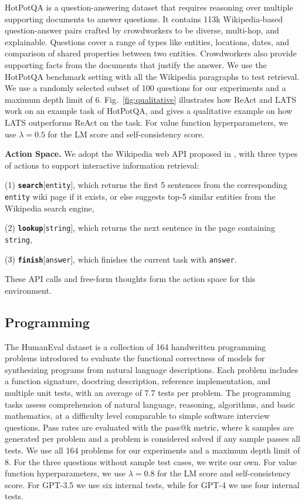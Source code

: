 {HotPotQA \citep{yang2018hotpotqa} is a question-answering dataset that requires reasoning over multiple supporting documents to answer questions. It contains 113k Wikipedia-based question-answer pairs crafted by crowdworkers to be diverse, multi-hop, and explainable. Questions cover a range of types like entities, locations, dates, and comparison of shared properties between two entities. Crowdworkers also provide supporting facts from the documents that justify the answer. We use the HotPotQA benchmark setting with all the Wikipedia paragraphs to test retrieval. We use a randomly selected subset of 100 questions for our experiments and a maximum depth limit of 6. {Fig.~\ref{fig:qualitative} illustrates how ReAct and LATS work on an example task of HotPotQA, and gives a qualitative example on how LATS outperforms ReAct on the task. } For value function hyperparameters, we use $\lambda = 0.5$ for the LM score and self-consistency score.

\textbf{Action Space.} We adopt the Wikipedia web API proposed in \citet{yao2023react}, with three types of actions to support interactive information retrieval: 

(1) \textbf{\texttt{search}}[\texttt{entity}], which returns the first 5 sentences from the corresponding \texttt{entity} wiki page if it exists, or else suggests top-5 similar entities from the Wikipedia search engine, 

(2) \textbf{\texttt{lookup}}[\texttt{string}], which returns the next sentence in the page containing \texttt{string}, 

(3) \textbf{\texttt{finish}}[\texttt{answer}], which finishes the current task with \texttt{answer}.

These API calls and free-form thoughts form the action space for this environment.

\subsection{Programming}

The HumanEval dataset \citep{chen2021evaluating} is a collection of 164 handwritten programming problems introduced to evaluate the functional correctness of models for synthesizing programs from natural language descriptions. Each problem includes a function signature, docstring description, reference implementation, and multiple unit tests, with an average of 7.7 tests per problem. The programming tasks assess comprehension of natural language, reasoning, algorithms, and basic mathematics, at a difficulty level comparable to simple software interview questions. Pass rates are evaluated with the pass@k metric, where k samples are generated per problem and a problem is considered solved if any sample passes all tests. We use all 164 problems for our experiments and a maximum depth limit of 8. For the three questions without sample test cases, we write our own. For value function hyperparameters, we use $\lambda = 0.8$ for the LM score and self-consistency score. For GPT-3.5 we use six internal tests, while for GPT-4 we use four internal tests.

}
